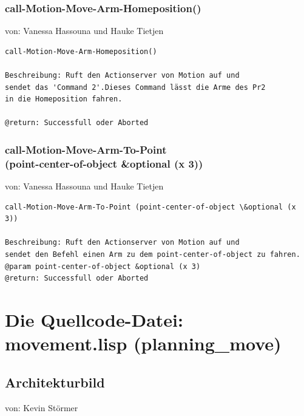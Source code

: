 \documentclass{suturo}
\makeatletter
\newcommand{\chapterauthor}[1]{%
  {\parindent0pt\vspace*{-27pt}%
  \linespread{0}\small\begin{flushright}von: #1\end{flushright}%
  \par\nobreak\vspace*{0pt}}
  \@afterheading%
}
\makeatother
\begin{document}
\subsubsection{call-Motion-Move-Arm-Homeposition()}
\chapterauthor{Vanessa Hassouna und Hauke Tietjen}
\begin{verbatim}
call-Motion-Move-Arm-Homeposition()

Beschreibung: Ruft den Actionserver von Motion auf und
sendet das 'Command 2'.Dieses Command lässt die Arme des Pr2 
in die Homeposition fahren.

@return: Successfull oder Aborted
\end{verbatim}



\subsubsection{call-Motion-Move-Arm-To-Point \\
(point-center-of-object \&optional (x 3))
}
\chapterauthor{Vanessa Hassouna und Hauke Tietjen}
\begin{verbatim}
call-Motion-Move-Arm-To-Point (point-center-of-object \&optional (x 3))

Beschreibung: Ruft den Actionserver von Motion auf und 
sendet den Befehl einen Arm zu dem point-center-of-object zu fahren.
@param point-center-of-object &optional (x 3)
@return: Successfull oder Aborted
\end{verbatim}

\newpage
\section{Die Quellcode-Datei: movement.lisp (planning\_move)}
\subsection{Architekturbild}
\chapterauthor{Kevin Störmer}


\begin{figure}[!htb]
\end{figure}
\end{document}
